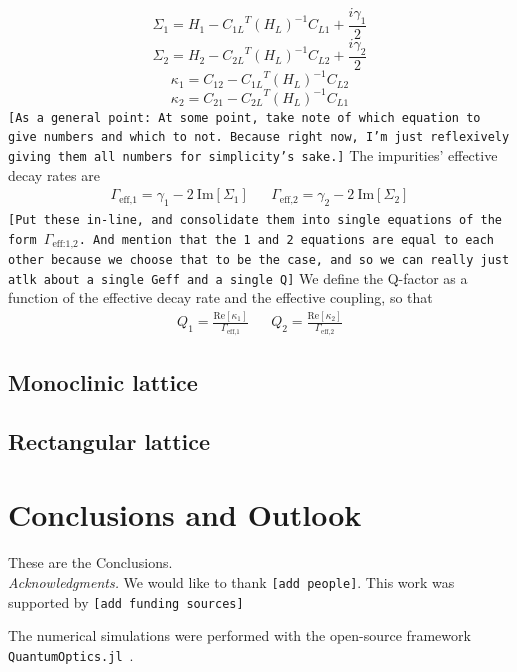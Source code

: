 \documentclass[aps,pra,superscriptaddress,twocolumn]{revtex4-1}
\newcommand{\re}{\mathrm{Re}}
\newcommand{\im}{\mathrm{Im}}
\newcommand{\commentSB}[1]{\texttt{\color{blue}[#1]}}
\newcommand{\commentSO}[1]{\texttt{\color{orange}[#1]}}
\newcommand{\commentTP}[1]{\texttt{\color{green}[#1]}}
\begin{document}
\begin{equation}
    \Sigma_1 = H_1 - {C_{1L}}^T (H_L)^{-1} C_{L1} + \frac{i \gamma_1}{2}
\end{equation}
\begin{equation}
    \Sigma_2 = H_2 - {C_{2L}}^T (H_L)^{-1} C_{L2} + \frac{i \gamma_2}{2}
\end{equation}
\begin{equation}
    \kappa_1 = C_{12} - {C_{1L}}^T (H_L)^{-1} C_{L2} 
\end{equation}
\begin{equation}
    \kappa_2 = C_{21} - {C_{2L}}^T (H_L)^{-1} C_{L1} 
\end{equation}
\commentSB{As a general point: At some point, take note of which equation to give numbers and which to not. Because right now, I'm just reflexively giving them all numbers for simplicity's sake.}
The impurities' effective decay rates are 
\begin{align}
    \Gamma_\text{eff,1} = \gamma_1 - 2~\im[\Sigma_1] &&
    \Gamma_\text{eff,2} = \gamma_2 - 2~\im[\Sigma_2]
\end{align}
\commentTP{Put these in-line, and consolidate them into single equations of the form $\Gamma_\text{eff:1,2}$. And mention that the 1 and 2 equations are equal to each other because we choose that to be the case, and so we can really just atlk about a single Geff and a single Q}
We define the Q-factor as a function of the effective decay rate and the effective coupling, so that 
\begin{align}
    Q_1 = \frac{\re[\kappa_1]}{\Gamma_\text{eff,1}} && Q_2 = \frac{\re[\kappa_2]}{\Gamma_\text{eff,2}} 
\end{align}

\subsection{Monoclinic lattice}


\subsection{Rectangular lattice}


\section{Conclusions and Outlook}\label{sec:conclusion}

These are the Conclusions.\\[2ex]

\emph{Acknowledgments.} We would like to thank \commentSO{add people}. This work was supported by \commentSO{add funding sources}

The numerical simulations were performed with the open-source framework \texttt{QuantumOptics.jl}~\cite{kramer_quantumopticsjl_2018}.




\end{document}
